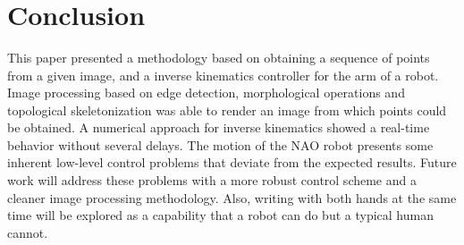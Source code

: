 \documentclass[conference]{IEEEtran}
\begin{document}
\begin{figure}
	\centering
	\\
	\\
	\\
\end{figure}

\section{Conclusion}
\label{sec:conclusion}
This paper presented a methodology based on obtaining a sequence of points from a given image, and a inverse kinematics controller for the arm of a robot. Image processing based on edge detection, morphological operations and topological skeletonization was able to render an image from which points could be obtained. A numerical approach for inverse kinematics showed a real-time behavior without several delays. The motion of the NAO robot presents some inherent low-level control problems that deviate from the expected results. Future work will address these problems with a more robust control scheme and a cleaner image processing methodology. Also, writing with both hands at the same time will be explored as a capability that a robot can do but a typical human cannot.



\end{document}
